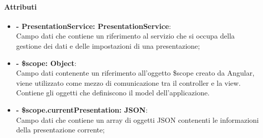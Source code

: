 	\paragraph{Attributi}
	\begin{itemize}
		\item \textbf{- PresentationService: PresentationService}:\\
			Campo dati che contiene un riferimento al servizio che si occupa della gestione dei dati e delle impostazioni di una presentazione;
		\item \textbf{- \$scope: Object}:\\
			Campo dati contenente un riferimento all'oggetto \$scope creato da Angular, viene utilizzato come mezzo di comunicazione tra il controller e la view. Contiene gli oggetti che definiscono il model dell'applicazione.
		\item \textbf{- \$scope.currentPresentation: JSON}:\\
			Campo dati che contiene un array di oggetti JSON contenenti le informazioni della presentazione corrente;		
		
	\end{itemize}
	
